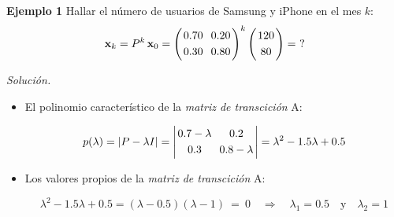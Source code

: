 {\nologo
\begin{frame}%
	
	\begin{ej}{\textbf{Ejemplo 1}}
		Hallar el número de usuarios de Samsung y iPhone en el mes $k$:
		\[
		\mathbf{x}_k = P^k\, \mathbf{x}_0 =
		\left(
		\begin{array}{@{\hspace{0.2\tabcolsep}}c@{\hspace{1.2\tabcolsep}}c@{\hspace{0.2\tabcolsep}}}
		0.70 & 0.20 \\[1mm]
		0.30 & 0.80
		\end{array}
		\right)^k
		\left(
		\begin{array}{@{\hspace{0.2\tabcolsep}}c@{\hspace{0.2\tabcolsep}}}
		120 \\[1mm]
		80
		\end{array}
		\right)
		= \ ?	
		\]
	\end{ej}	
	
	\textit{Solución.}
	
	\vspace{2mm}
	\begin{itemize}
		\item El polinomio característico de la \textit{matriz de transcición} A:
		
		\vspace{2mm}
		\[	
			p(\lambda) = |P-\lambda I| 
			=
			\left|	
			\begin{array}{@{\hspace{0.2\tabcolsep}}c@{\hspace{1.2\tabcolsep}}c@{\hspace{0.2\tabcolsep}}}
			0.7-\lambda & 0.2 \\[1mm]
			0.3 & 0.8-\lambda
			\end{array}
			\right| 
			=
			\lambda^2 - 1.5\lambda + 0.5		
		\]
		
		\vspace{6mm}
		\item Los valores propios de la \textit{matriz de transcición} A:
		
		\vspace{-0mm}
		\[
			\lambda^2 - 1.5\lambda + 0.5 =
			\left( \lambda - 0.5 \right) \left( \lambda - 1 \right) \ = \ 0 
			\quad  \Longrightarrow \quad   
			\lambda_1 = 0.5 \quad \text{y} \quad   \lambda_2 = 1
		\]				
		
	\end{itemize}
	
\end{frame}
}

